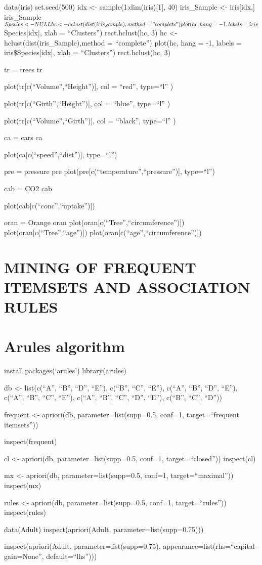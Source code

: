 \documentclass[
]{article}
\begin{document}
data(iris) set.seed(500) idx \textless- sample(1:dim(iris){[}1{]}, 40)
iris\_Sample \textless- iris{[}idx,{]} iris\_Sample\(Species <- NULL
hc <- hclust(dist(iris_Sample), method = "complete")
plot(hc, hang = -1, labels = iris\)Species{[}idx{]}, xlab =
``Clusters'') rect.hclust(hc, 3) hc \textless-
hclust(dist(iris\_Sample),method = ``complete'') plot(hc, hang = -1,
labels = iris\$Species{[}idx{]}, xlab = ``Clusters'') rect.hclust(hc, 3)

tr = trees tr

plot(tr{[}c(``Volume'',``Height''){]}, col = ``red'', type=``l'' )

plot(tr{[}c(``Girth'',``Height''){]}, col = ``blue'', type=``l'' )

plot(tr{[}c(``Volume'',``Girth''){]}, col = ``black'', type=``l'' )

ca = cars ca

plot(ca{[}c(``speed'',``dist''){]}, type=``l'')

pre = pressure pre plot(pre{[}c(``temperature'',``pressure''){]},
type=``l'')

cab = CO2 cab

plot(cab{[}c(``conc'',``uptake''){]})

oran = Orange oran plot(oran{[}c(``Tree'',``circumference''){]})
plot(oran{[}c(``Tree'',``age''){]})
plot(oran{[}c(``age'',``circumference''){]})

\section{MINING OF FREQUENT ITEMSETS AND ASSOCIATION
RULES}\label{mining-of-frequent-itemsets-and-association-rules}

\section{Arules algorithm}\label{arules-algorithm}

install.packages(`arules') library(arules)

db \textless- list(c(``A'', ``B'', ``D'', ``E''), c(``B'', ``C'',
``E''), c(``A'', ``B'', ``D'', ``E''), c(``A'', ``B'', ``C'', ``E''),
c(``A'', ``B'', ``C'', ``D'', ``E''), c(``B'', ``C'', ``D''))

frequent \textless- apriori(db, parameter=list(supp=0.5, conf=1,
target=``frequent itemsets''))

inspect(frequent)

cl \textless- apriori(db, parameter=list(supp=0.5, conf=1,
target=``closed'')) inspect(cl)

mx \textless- apriori(db, parameter=list(supp=0.5, conf=1,
target=``maximal'')) inspect(mx)

rules \textless- apriori(db, parameter=list(supp=0.5, conf=1,
target=``rules'')) inspect(rules)

data(Adult) inspect(apriori(Adult, parameter=list(supp=0.75)))

inspect(apriori(Adult, parameter=list(supp=0.75),
appearance=list(rhs=``capital-gain=None'', default=``lhs'')))
\end{document}
